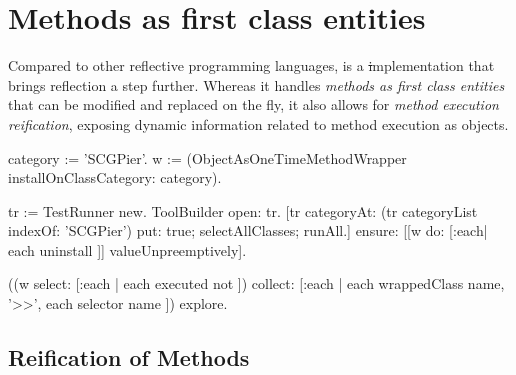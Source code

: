 \documentclass[a4paper,10pt,twoside]{book}
\begin{document}


\section{Methods as first class entities}

Compared to other reflective programming languages, \pharo is a \st implementation that brings reflection a step further. Whereas it handles \emph{methods as first class entities} that can be modified and replaced on the fly, it also allows for \emph{method execution reification}, exposing dynamic information related to method execution as objects.




\begin{code}{}
category := 'SCGPier'.
w := (ObjectAsOneTimeMethodWrapper installOnClassCategory: category).

tr := TestRunner new.
ToolBuilder open: tr.
[tr
	categoryAt: (tr categoryList indexOf: 'SCGPier') put: true;
	selectAllClasses;
	runAll.]
ensure: [[w do: [:each| each uninstall ]] valueUnpreemptively].

((w select: [:each | each executed not ])
	collect: [:each | each wrappedClass name, '>>', each selector name ]) explore.
\end{code}


\subsection{Reification of Methods} 
\end{document}
